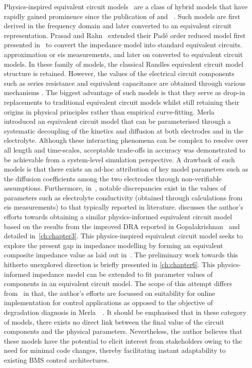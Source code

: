 Physics-inspired equivalent circuit models~\cite{Merla2018,Prasad2014,Zhang2017} are a class of hybrid models that have
rapidly gained prominence since the publication of\cite{Jokar2016} and ~\cite{Fan2015}. Such models are first derived in
the frequency domain and later converted to an equivalent circuit representation. Prasad and Rahn~\cite{Prasad2014}
extended their Padé order reduced model first presented in~\cite{Prasad2013} to convert the impedance model into
standard equivalent circuits. approximation or \gls{eis} measurements, and later on converted to equivalent circuit
models. In these family of models, the classical Randles equivalent circuit model structure is retained. However, the
values of the electrical circuit components such as series resistance and equivalent capacitance  are obtained through
various mechanisms . The biggest advantage of such models is that they serve as drop-in
replacements to traditional equivalent circuit models whilst still retaining their origins in physical principles rather
than empirical curve-fitting. Merla~\etal{}~\cite{Merla2018} introduced an equivalent circuit model that can be
parameterised through a systematic decoupling of the kinetics and diffusion at both electrodes and in the electrolyte.
Although these interacting phenomena can be complex to resolve over all length and time-scales, acceptable trade-offs in
accuracy was demonstrated to be achievable from a system-level simulation perspective. A drawback of such models is that
there exists an ad-hoc attribution of key model parameters such as the diffusion coefficients among the two electrodes
through non-verifiable assumptions. Furthermore, in~\cite{Merla2018}, notable discrepancies exist in the values of
parameters such as electrolyte conductivity (obtained through calculations from \gls{eis} measurements) to that
typically reported in literature.  discusses the author's efforts towards obtaining a similar
physics-informed equivalent circuit model based on the results from the improved DRA reported in
Gopalakrishnan\etal{}~\cite{Gopalakrishnan2017} and detailed in~\cref{ch:chapter3}. This physics-inspired equivalent
circuit model seeks to explore the present gap in impedance modelling by forming an equivalent composite impedance value
as laid out in~\cite{Smith2007}. The preliminary work towards this hitherto unexplored direction is briefly presented in
\cref{ch:chapter6}. This physics-informed impedance model can be extended to fit parameter values of components in an
equivalent circuit model. The scope of this attempt differs from~\cite{Merla2018} in that, the author's efforts are
focussed on suitability for online implementation for control applications as opposed to the objective of degradation
diagnosis in Merla~\etal~\cite{Merla2018}. It should be emphasised that in these category of models, there exists no
direct link between the final value of the circuit components and the physical parameters. Nevertheless, the author
believes that these models have the potential to elicit interest from stakeholders owing to the need for minimal code
changes, thereby facilitating instant adaptability to existing BMS control architectures.

